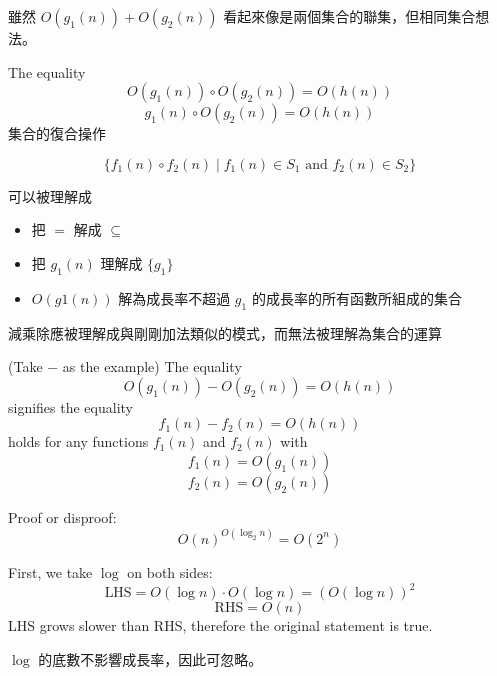 \begin{remark}
    雖然 $O(g_1(n)) + O(g_2(n))$ 看起來像是兩個集合的聯集，但相同集合想法\textbf{}。
\end{remark}

\begin{definition} The equality \[
        O(g_1(n))\circ O(g_2(n)) = O(h(n))
    \]\[
        g_1(n) \circ O(g_2(n)) = O(h(n))
    \]
    集合的復合操作
    \begin{notation}
        $$
        \{f_1(n)\circ f_2(n) \; | \; f_1(n) \in S_1 \text{ and } f_2(n) \in S_2\}
        $$
    \end{notation}
    可以被理解成
    \begin{itemize}
        \item 把 $=$ 解成 $\subseteq$
        \item 把 $g_1(n)$ 理解成 $\{g_1\}$
        \item $O(g1(n))$ 解為成長率不超過 $g_1$ 的成長率的所有函數所組成的集合
    \end{itemize}
\end{definition}

\begin{remark}
    減乘除應被理解成與剛剛加法類似的模式，而無法被理解為集合的運算
\end{remark}

\begin{definition}
    (Take $-$ as the example) The equality \[ O(g_1(n)) - O(g_2(n)) = O(h(n)) \] signifies the equality \[
        f_1(n) - f_2(n) = O(h(n))
    \]
    holds for any functions $f_1(n)$ and $f_2(n)$ with
    \[
        f_1(n) = O(g_1(n))
    \]
    \[
        f_2(n) = O(g_2(n))
    \]
\end{definition}

\begin{exercise}
    Proof or disproof: \[
        O(n)^{O(\log_2 n)} = O(2^n)
    \]
\end{exercise}
\begin{answer}
    First, we take $\log$ on both sides:
    \[
        \text{LHS} = O(\log n) \cdot O(\log n) = (O(\log n))^2
    \]    
    \[
        \text{RHS} = O(n)
    \]
    LHS grows slower than RHS, therefore the original statement is true.
\end{answer}
\begin{remark}
    $\log$ 的底數不影響成長率，因此可忽略。
\end{remark}


